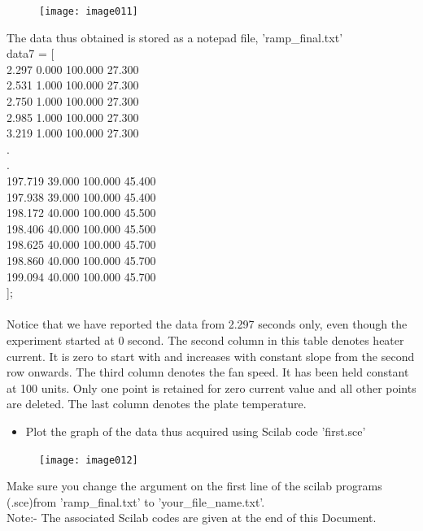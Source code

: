 \documentclass[12pt,prb]{article}
\begin{document}
\begin{figure}[h]
\centering
\texttt{[image: image011]}
\caption{}
\end{figure}
The data thus obtained is stored as a notepad file, 'ramp\_final.txt'\\
data7 = [\\
2.297		0.000		100.000	27.300\\
2.531		1.000		100.000	27.300\\
2.750		1.000		100.000	27.300\\
2.985		1.000		100.000	27.300\\
3.219		1.000		100.000	27.300\\
.\\
.\\
197.719          	39.000		100.000	45.400\\
197.938	39.000		100.000	45.400\\
198.172	40.000		100.000	45.500\\
198.406	40.000		100.000	45.500\\
198.625	40.000		100.000	45.700\\
198.860	40.000		100.000	45.700\\
199.094	40.000		100.000	45.700\\
 ];\\\\
Notice that we have reported the data from 2.297 seconds only, even though the experiment started at 0 second. The second column in this table denotes heater current. It is zero to start with and increases with constant slope from the second row onwards. The third column denotes the fan speed. It has been held constant at 100 units. Only one point is retained for zero current value and all other points are deleted. The last column denotes the plate temperature.
\newpage
\begin{itemize}
\item Plot the graph of the data thus acquired using Scilab code 'first.sce'\\
 \end{itemize}
\begin{figure}[h]
\centering
\texttt{[image: image012]}
\caption{}
\label{figure 4}
\end{figure}
Make sure you change the argument on the first line of the scilab programs (.sce)from 'ramp\_final.txt' to 'your\_file\_name.txt'.
\vspace{3cm}\\
Note:- The associated Scilab codes are given at the end of this Document.
\newpage
\end{document}
